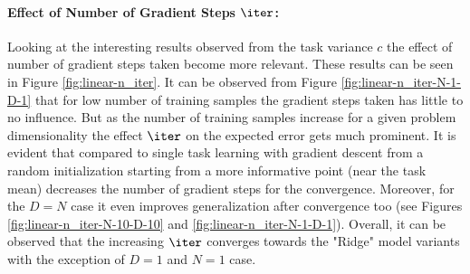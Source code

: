 \paragraph{Effect of Number of Gradient Steps $\iter$:} Looking at the interesting results observed from the task variance $c$  the effect of number of gradient steps taken become more relevant. These results can be seen in Figure \ref{fig:linear-n_iter}. It can be observed from Figure \ref{fig:linear-n_iter-N-1-D-1} that for low number of training samples the gradient steps taken has little to no influence. But as the number of training samples increase for a given problem dimensionality the effect $\iter$ on the expected  error gets much prominent. It is evident that compared to single task learning with gradient descent from a random initialization starting from a more informative point (\eg near the task mean) decreases the number of gradient steps for the convergence. Moreover, for the $D=N$ case it even improves generalization after convergence too (see Figures \ref{fig:linear-n_iter-N-10-D-10} and \ref{fig:linear-n_iter-N-1-D-1}). Overall, it can be observed that the increasing $\iter$ converges towards the "Ridge" model variants with the exception of $D=1$ and $N=1$ case.
 
